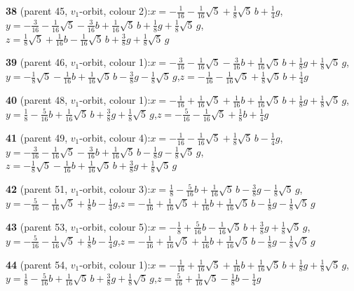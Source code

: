 \documentclass[10pt]{article}
\begin{document}
{\noindent\textbf{38} (parent 45, $v_1$-orbit, colour 2):\quad $x=-\tfrac{1}{16}-\tfrac{1}{16}\sqrt5+\tfrac{1}{8}\sqrt5\,b+\tfrac{1}{4}g$,\quad $y=-\tfrac{3}{16}-\tfrac{1}{16}\sqrt5-\tfrac{3}{16}b+\tfrac{1}{16}\sqrt5\,b+\tfrac{1}{8}g+\tfrac{1}{8}\sqrt5\,g$,\quad $z=\tfrac{1}{8}\sqrt5+\tfrac{1}{16}b-\tfrac{1}{16}\sqrt5\,b+\tfrac{3}{8}g+\tfrac{1}{8}\sqrt5\,g$\par\smallskip
\noindent\textbf{39} (parent 46, $v_1$-orbit, colour 1):\quad $x=-\tfrac{3}{16}-\tfrac{1}{16}\sqrt5-\tfrac{3}{16}b+\tfrac{1}{16}\sqrt5\,b+\tfrac{1}{8}g+\tfrac{1}{8}\sqrt5\,g$,\quad $y=-\tfrac{1}{8}\sqrt5-\tfrac{1}{16}b+\tfrac{1}{16}\sqrt5\,b-\tfrac{3}{8}g-\tfrac{1}{8}\sqrt5\,g$,\quad $z=-\tfrac{1}{16}-\tfrac{1}{16}\sqrt5+\tfrac{1}{8}\sqrt5\,b+\tfrac{1}{4}g$\par\smallskip
\noindent\textbf{40} (parent 48, $v_1$-orbit, colour 1):\quad $x=-\tfrac{1}{16}+\tfrac{1}{16}\sqrt5+\tfrac{1}{16}b+\tfrac{1}{16}\sqrt5\,b+\tfrac{1}{8}g+\tfrac{1}{8}\sqrt5\,g$,\quad $y=\tfrac{1}{8}-\tfrac{5}{16}b+\tfrac{1}{16}\sqrt5\,b+\tfrac{3}{8}g+\tfrac{1}{8}\sqrt5\,g$,\quad $z=-\tfrac{5}{16}-\tfrac{1}{16}\sqrt5+\tfrac{1}{8}b+\tfrac{1}{4}g$\par\smallskip
\noindent\textbf{41} (parent 49, $v_1$-orbit, colour 4):\quad $x=-\tfrac{1}{16}-\tfrac{1}{16}\sqrt5+\tfrac{1}{8}\sqrt5\,b-\tfrac{1}{4}g$,\quad $y=-\tfrac{3}{16}-\tfrac{1}{16}\sqrt5-\tfrac{3}{16}b+\tfrac{1}{16}\sqrt5\,b-\tfrac{1}{8}g-\tfrac{1}{8}\sqrt5\,g$,\quad $z=-\tfrac{1}{8}\sqrt5-\tfrac{1}{16}b+\tfrac{1}{16}\sqrt5\,b+\tfrac{3}{8}g+\tfrac{1}{8}\sqrt5\,g$\par\smallskip
\noindent\textbf{42} (parent 51, $v_1$-orbit, colour 3):\quad $x=\tfrac{1}{8}-\tfrac{5}{16}b+\tfrac{1}{16}\sqrt5\,b-\tfrac{3}{8}g-\tfrac{1}{8}\sqrt5\,g$,\quad $y=-\tfrac{5}{16}-\tfrac{1}{16}\sqrt5+\tfrac{1}{8}b-\tfrac{1}{4}g$,\quad $z=-\tfrac{1}{16}+\tfrac{1}{16}\sqrt5+\tfrac{1}{16}b+\tfrac{1}{16}\sqrt5\,b-\tfrac{1}{8}g-\tfrac{1}{8}\sqrt5\,g$\par\smallskip
\noindent\textbf{43} (parent 53, $v_1$-orbit, colour 5):\quad $x=-\tfrac{1}{8}+\tfrac{5}{16}b-\tfrac{1}{16}\sqrt5\,b+\tfrac{3}{8}g+\tfrac{1}{8}\sqrt5\,g$,\quad $y=-\tfrac{5}{16}-\tfrac{1}{16}\sqrt5+\tfrac{1}{8}b-\tfrac{1}{4}g$,\quad $z=-\tfrac{1}{16}+\tfrac{1}{16}\sqrt5+\tfrac{1}{16}b+\tfrac{1}{16}\sqrt5\,b-\tfrac{1}{8}g-\tfrac{1}{8}\sqrt5\,g$\par\smallskip
\noindent\textbf{44} (parent 54, $v_1$-orbit, colour 1):\quad $x=-\tfrac{1}{16}+\tfrac{1}{16}\sqrt5+\tfrac{1}{16}b+\tfrac{1}{16}\sqrt5\,b+\tfrac{1}{8}g+\tfrac{1}{8}\sqrt5\,g$,\quad $y=\tfrac{1}{8}-\tfrac{5}{16}b+\tfrac{1}{16}\sqrt5\,b+\tfrac{3}{8}g+\tfrac{1}{8}\sqrt5\,g$,\quad $z=\tfrac{5}{16}+\tfrac{1}{16}\sqrt5-\tfrac{1}{8}b-\tfrac{1}{4}g$\par\smallskip
}
\end{document}
